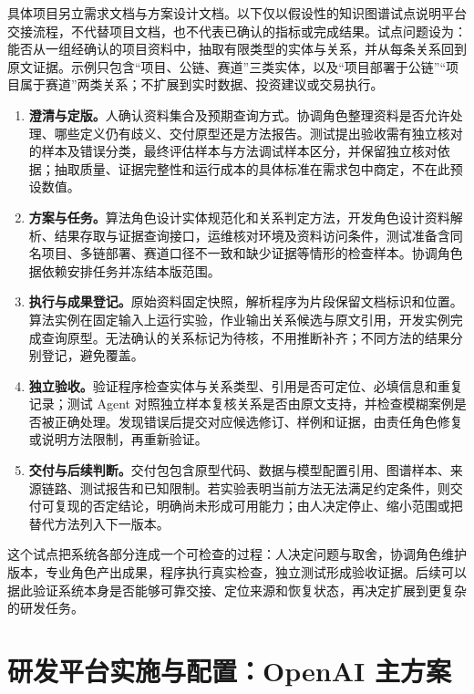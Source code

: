 \documentclass[11pt,a4paper]{article}
\begin{document}
具体项目另立需求文档与方案设计文档。以下仅以假设性的知识图谱试点说明平台交接流程，不代替项目文档，也不代表已确认的指标或完成结果。试点问题设为：能否从一组经确认的项目资料中，抽取有限类型的实体与关系，并从每条关系回到原文证据。示例只包含“项目、公链、赛道”三类实体，以及“项目部署于公链”“项目属于赛道”两类关系；不扩展到实时数据、投资建议或交易执行。

\begin{enumerate}[leftmargin=2em,itemsep=4pt]
  \item \textbf{澄清与定版。}人确认资料集合及预期查询方式。协调角色整理资料是否允许处理、哪些定义仍有歧义、交付原型还是方法报告。测试提出验收需有独立核对的样本及错误分类，最终评估样本与方法调试样本区分，并保留独立核对依据；抽取质量、证据完整性和运行成本的具体标准在需求包中商定，不在此预设数值。
  \item \textbf{方案与任务。}算法角色设计实体规范化和关系判定方法，开发角色设计资料解析、结果存取与证据查询接口，运维核对环境及资料访问条件，测试准备含同名项目、多链部署、赛道口径不一致和缺少证据等情形的检查样本。协调角色据依赖安排任务并冻结本版范围。
  \item \textbf{执行与成果登记。}原始资料固定快照，解析程序为片段保留文档标识和位置。算法实例在固定输入上运行实验，作业输出关系候选与原文引用，开发实例完成查询原型。无法确认的关系标记为待核，不用推断补齐；不同方法的结果分别登记，避免覆盖。
  \item \textbf{独立验收。}验证程序检查实体与关系类型、引用是否可定位、必填信息和重复记录；测试 Agent 对照独立样本复核关系是否由原文支持，并检查模糊案例是否被正确处理。发现错误后提交对应候选修订、样例和证据，由责任角色修复或说明方法限制，再重新验证。
  \item \textbf{交付与后续判断。}交付包包含原型代码、数据与模型配置引用、图谱样本、来源链路、测试报告和已知限制。若实验表明当前方法无法满足约定条件，则交付可复现的否定结论，明确尚未形成可用能力；由人决定停止、缩小范围或把替代方法列入下一版本。
\end{enumerate}

这个试点把系统各部分连成一个可检查的过程：人决定问题与取舍，协调角色维护版本，专业角色产出成果，程序执行真实检查，独立测试形成验收证据。后续可以据此验证系统本身是否能够可靠交接、定位来源和恢复状态，再决定扩展到更复杂的研发任务。


\section{研发平台实施与配置：OpenAI 主方案}
\end{document}
